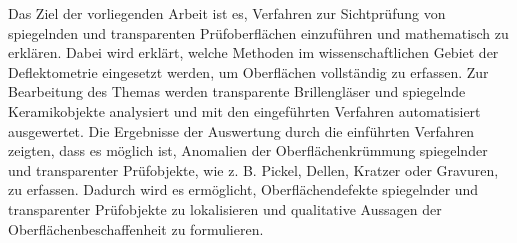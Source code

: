 \noindent
Das Ziel der vorliegenden Arbeit ist es, Verfahren zur Sichtprüfung von spiegelnden und transparenten Prüfoberflächen einzuführen und mathematisch zu erklären.
Dabei wird erklärt, welche Methoden im wissenschaftlichen Gebiet der Deflektometrie eingesetzt werden, um Oberflächen vollständig zu erfassen.
Zur Bearbeitung des Themas werden transparente Brillengläser und spiegelnde Keramikobjekte analysiert und mit den eingeführten Verfahren automatisiert ausgewertet.
Die Ergebnisse der Auswertung durch die einführten Verfahren zeigten, dass es möglich ist, Anomalien der Oberflächenkrümmung spiegelnder und transparenter Prüfobjekte, wie z. B. Pickel, Dellen, Kratzer oder Gravuren, zu erfassen.
Dadurch wird es ermöglicht, Oberflächendefekte spiegelnder und transparenter Prüfobjekte zu lokalisieren und qualitative Aussagen der Oberflächenbeschaffenheit zu formulieren.